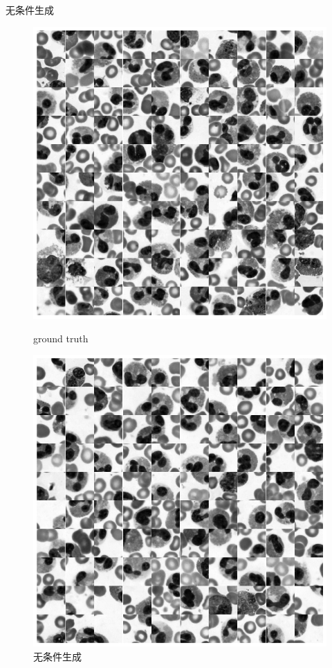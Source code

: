 \documentclass[10pt]{beamer}
\begin{document}
\begin{frame}[fragile]{无条件生成}
  \begin{figure}[htbp]
    \centering
    \begin{minipage}[t]{0.49\textwidth}
    \centering
    \includegraphics[width=1\linewidth]{imgs/gt.png}
    \caption{ground truth}
    \label{fig:gt}
    \end{minipage}
    \begin{minipage}[t]{0.49\textwidth}
    \centering
    \includegraphics[width=1\linewidth]{imgs/uncon.png}
    \caption{无条件生成}
    \label{fig:uncon}
    \end{minipage}
    \end{figure}


\end{frame}
\end{document}
